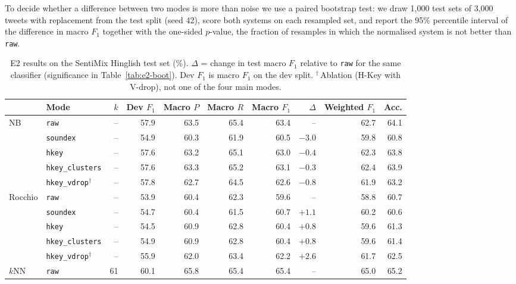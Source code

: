 To decide whether a difference between two modes is more than noise we use a paired bootstrap
test: we draw 1{,}000 test sets of 3{,}000 tweets with replacement from the test split (seed 42),
score both systems on each resampled set, and report the 95\% percentile interval of the
difference in macro $F_1$ together with the one-sided $p$-value, the fraction of resamples in which
the normalised system is not better than \texttt{raw}.

\begin{table}[t]
\centering
\small
\caption{E2 results on the SentiMix Hinglish test set (\%). $\Delta$ = change in test macro $F_1$
relative to \texttt{raw} for the same classifier (significance in Table~\ref{tab:e2-boot}). Dev
$F_1$ is macro $F_1$ on the dev split. $^\dagger$\,Ablation (H-Key with V-drop), not one of the
four main modes.}
\label{tab:e2-main}
\begin{tabular}{llrrrrrrrr}
\toprule
 & Mode & $k$ & Dev $F_1$ & Macro $P$ & Macro $R$ & Macro $F_1$ & $\Delta$ & Weighted $F_1$ & Acc. \\
\midrule
NB      & \texttt{raw}            & --  & 57.9 & 63.5 & 65.4 & 63.4 & --   & 62.7 & 64.1 \\
        & \texttt{soundex}        & --  & 54.9 & 60.3 & 61.9 & 60.5 & $-3.0$ & 59.8 & 60.8 \\
        & \texttt{hkey}           & --  & 57.6 & 63.2 & 65.1 & 63.0 & $-0.4$ & 62.3 & 63.8 \\
        & \texttt{hkey\_clusters} & --  & 57.6 & 63.3 & 65.2 & 63.1 & $-0.3$ & 62.4 & 63.9 \\
        & \texttt{hkey\_vdrop}$^\dagger$ & -- & 57.8 & 62.7 & 64.5 & 62.6 & $-0.8$ & 61.9 & 63.2 \\
\midrule
Rocchio & \texttt{raw}            & --  & 53.9 & 60.4 & 62.3 & 59.6 & --   & 58.8 & 60.7 \\
        & \texttt{soundex}        & --  & 54.7 & 60.4 & 61.5 & 60.7 & $+1.1$ & 60.2 & 60.6 \\
        & \texttt{hkey}           & --  & 54.5 & 60.9 & 62.8 & 60.4 & $+0.8$ & 59.6 & 61.3 \\
        & \texttt{hkey\_clusters} & --  & 54.9 & 60.9 & 62.8 & 60.4 & $+0.8$ & 59.6 & 61.4 \\
        & \texttt{hkey\_vdrop}$^\dagger$ & -- & 55.9 & 62.0 & 63.4 & 62.2 & $+2.6$ & 61.7 & 62.5 \\
\midrule
$k$NN   & \texttt{raw}            & 61  & 60.1 & 65.8 & 65.4 & 65.4 & --   & 65.0 & 65.2 \\

\end{tabular}
\end{table}
